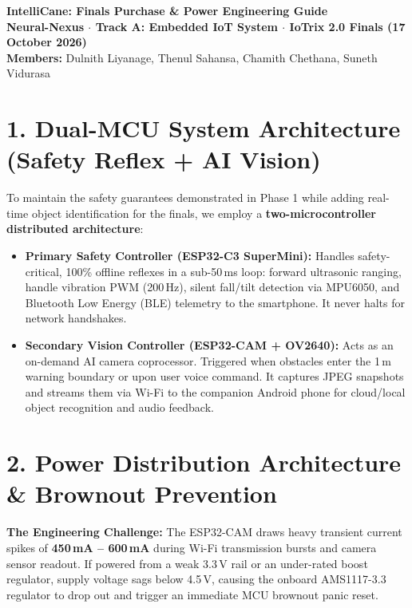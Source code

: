 \documentclass[10pt,a4paper]{article}
\begin{document}
\begin{center}
    {\LARGE\bfseries\color{primary} IntelliCane: Finals Purchase \& Power Engineering Guide}\\[3pt]
    {\normalsize\bfseries Neural-Nexus $\cdot$ Track A: Embedded IoT System $\cdot$ IoTrix 2.0 Finals (17 October 2026)}\\[2pt]
    {\small \textbf{Members:} Dulnith Liyanage, Thenul Sahansa, Chamith Chethana, Suneth Vidurasa}
\end{center}
\vspace{-0.6em}

\section{1. Dual-MCU System Architecture (Safety Reflex + AI Vision)}
To maintain the safety guarantees demonstrated in Phase 1 while adding real-time object identification for the finals, we employ a \textbf{two-microcontroller distributed architecture}:
\begin{itemize}
    \item \textbf{Primary Safety Controller (ESP32-C3 SuperMini):} Handles safety-critical, 100\% offline reflexes in a sub-50\,ms loop: forward ultrasonic ranging, handle vibration PWM (200\,Hz), silent fall/tilt detection via MPU6050, and Bluetooth Low Energy (BLE) telemetry to the smartphone. It never halts for network handshakes.
    \item \textbf{Secondary Vision Controller (ESP32-CAM + OV2640):} Acts as an on-demand AI camera coprocessor. Triggered when obstacles enter the 1\,m warning boundary or upon user voice command. It captures JPEG snapshots and streams them via Wi-Fi to the companion Android phone for cloud/local object recognition and audio feedback.
\end{itemize}

\section{2. Power Distribution Architecture \& Brownout Prevention}
\textbf{The Engineering Challenge:} The ESP32-CAM draws heavy transient current spikes of \textbf{450\,mA -- 600\,mA} during Wi-Fi transmission bursts and camera sensor readout. If powered from a weak 3.3\,V rail or an under-rated boost regulator, supply voltage sags below 4.5\,V, causing the onboard AMS1117-3.3 regulator to drop out and trigger an immediate MCU brownout panic reset.
\end{document}
